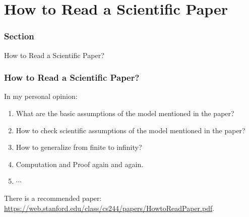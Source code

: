 \documentclass[aspectratio=2516]{beamer}
\begin{document}

\section{How to Read a Scientific Paper}

\begin{frame}
\frametitle{ Section \uppercase\expandafter{}}


\begin{center}
	\Large How to Read a Scientific Paper?
\end{center}

\end{frame}


\begin{frame}
	\frametitle{How to Read a Scientific Paper?}
	
	In my personal opinion:
	
	\vspace{0.5cm}
	
	\begin{enumerate}
		\item  What are the basic assumptions of the model mentioned in the paper?
		
		\vspace{0.5cm}
		
		\item  How to check scientific assumptions of the model mentioned in the paper?
		
		\vspace{0.5cm}
		
		\item  How to generalize from  finite to infinity?
		
		\vspace{0.5cm}
		
		\item  Computation and Proof  again and again. 
		
		\vspace{0.5cm}
		
		\item  $ \cdots $
		
	\end{enumerate}
	
	\vspace{0.25cm}
	
	{\tiny There is a recommended paper: \ {\color{blue} \url{https://web.stanford.edu/class/cs244/papers/HowtoReadPaper.pdf}}}.
\end{frame}
\end{document}
